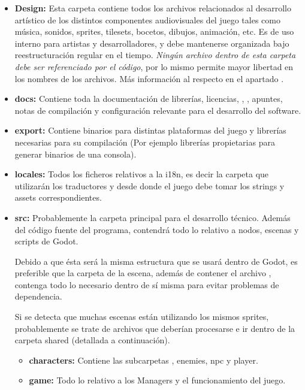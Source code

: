 \begin{itemize}
\item \textbf{Design:} Esta carpeta contiene todos los archivos relacionados al desarrollo artístico de los distintos componentes audiovisuales del juego tales como música, sonidos, sprites, tilesets, bocetos, dibujos, animación, etc. Es de uso interno para artistas y desarrolladores, y debe mantenerse organizada bajo reestructuración regular en el tiempo. \emph{Ningún archivo dentro de esta carpeta debe ser referenciado por el código}, por lo mismo permite mayor libertad en los nombres de los archivos. Más información al respecto en el apartado .

\item \textbf{docs:} Contiene toda la documentación de librerías, licencias, , , apuntes, notas de compilación y configuración relevante para el desarrollo del software.

\item \textbf{export:} Contiene binarios para distintas plataformas del juego y librerías necesarias para su compilación (Por ejemplo librerías propietarias para generar binarios de una consola).

\item \textbf{locales:} Todos los ficheros relativos a la i18n, es decir la carpeta que utilizarán los traductores y desde donde el juego debe tomar los strings y assets correspondientes.

\item \textbf{src:} Probablemente la carpeta principal para el desarrollo técnico. Además del código fuente del programa, contendrá todo lo relativo a nodos, escenas y scripts de Godot.

Debido a que ésta será la misma estructura que se usará
dentro de Godot, es preferible que la carpeta de la escena, además de contener el archivo , contenga todo lo necesario dentro de sí misma para evitar problemas de dependencia.

Si se detecta que muchas escenas están utilizando los mismos sprites, probablemente se trate de archivos que deberían procesarse e ir dentro de la carpeta shared (detallada a continuación).

\begin{itemize}
	\item \textbf{characters:} Contiene las subcarpetas , enemies, npc y player.

	\item \textbf{game:} Todo lo relativo a los Managers y el funcionamiento del juego.


\end{itemize}
\end{itemize}
